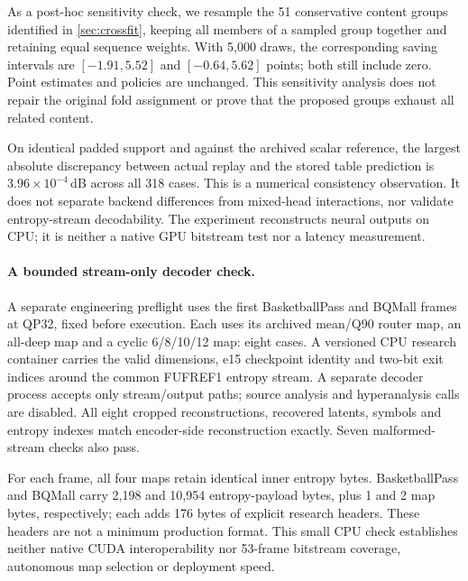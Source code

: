 As a post-hoc sensitivity check, we resample the 51 conservative content
groups identified in \cref{sec:crossfit}, keeping all members of a sampled
group together and retaining equal sequence weights. With 5,000 draws,
the corresponding saving intervals are $[-1.91,5.52]$ and $[-0.64,5.62]$
points; both still include zero. Point estimates and policies are unchanged.
This sensitivity analysis does not repair the original fold assignment or
prove that the proposed groups exhaust all related content.

On identical padded support and against the archived scalar reference,
the largest absolute discrepancy between actual replay and the stored
table prediction is $3.96\times10^{-4}$\,dB across all 318 cases.
This is a numerical consistency observation. It does not separate backend
differences from mixed-head interactions, nor validate entropy-stream
decodability. The experiment reconstructs neural outputs on CPU; it is
neither a native GPU bitstream test nor a latency measurement.

\paragraph{A bounded stream-only decoder check.}
A separate engineering preflight uses the first BasketballPass and BQMall
frames at QP32, fixed before execution. Each uses its archived mean/Q90
router map, an all-deep map and a cyclic 6/8/10/12 map: eight cases.
A versioned CPU research container carries the valid dimensions, e15
checkpoint identity and two-bit exit indices around the common FUFREF1
entropy stream. A separate decoder process accepts only stream/output
paths; source analysis and hyperanalysis calls are disabled. All eight
cropped reconstructions, recovered latents, symbols and entropy indexes
match encoder-side reconstruction exactly. Seven malformed-stream checks
also pass.

For each frame, all four maps retain identical inner entropy bytes.
BasketballPass and BQMall carry 2,198 and 10,954 entropy-payload bytes,
plus 1 and 2 map bytes, respectively; each adds 176 bytes of explicit
research headers. These headers are not a minimum production format.
This small CPU check establishes neither native CUDA interoperability nor
53-frame bitstream coverage, autonomous map selection or deployment speed.

